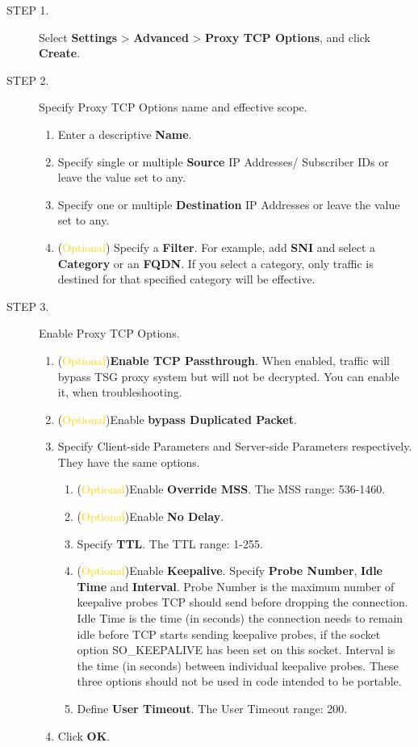 \begin{description}
    \item[STEP 1.]	Select \textbf{Settings} > \textbf{Advanced} > \textbf{Proxy TCP Options}, and click \textbf{Create}.
    \item[STEP 2.]	Specify Proxy TCP Options name and effective scope.
    \begin{enumerate}
        \item Enter a descriptive \textbf{Name}.
        \item Specify single or multiple \textbf{Source} IP Addresses/ Subscriber IDs or leave the value set to any.
        \item Specify one or multiple \textbf{Destination} IP Addresses or leave the value set to any.
        \item (\textcolor{gold}{Optional}) Specify a \textbf{Filter}. For example, add \textbf{SNI} and select a \textbf{Category} or an \textbf{FQDN}. If you select a category, only traffic is destined for that specified category will be effective.
    \end{enumerate}    
    \item[STEP 3.]	Enable Proxy TCP Options.
    \begin{enumerate}
        \item (\textcolor{gold}{Optional})\textbf{Enable TCP Passthrough}. When enabled, traffic will bypass TSG proxy system but will not be decrypted. You can enable it, when troubleshooting.
        \item (\textcolor{gold}{Optional})Enable \textbf{bypass Duplicated Packet}.
        \item Specify Client-side Parameters and Server-side Parameters respectively. They have the same options. 
        \begin{enumerate}
            \item (\textcolor{gold}{Optional})Enable \textbf{Override MSS}. The MSS range: 536-1460.
            \item (\textcolor{gold}{Optional})Enable \textbf{No Delay}.
            \item Specify \textbf{TTL}. The TTL range: 1-255.
            \item (\textcolor{gold}{Optional})Enable \textbf{Keepalive}. Specify \textbf{Probe Number}, \textbf{Idle Time} and \textbf{Interval}. Probe Number is the maximum number of keepalive probes TCP should send before dropping the connection. Idle Time is the time (in seconds) the connection needs to remain idle before TCP starts sending keepalive probes, if the socket option SO\_KEEPALIVE has been set on this socket. Interval is the time (in seconds) between individual keepalive probes. These three options should not be used in code intended to be portable.
            \item Define \textbf{User Timeout}. The User Timeout range: 200.
        \end{enumerate}        
        \item Click \textbf{OK}.
    \end{enumerate} 
\end{description} 

